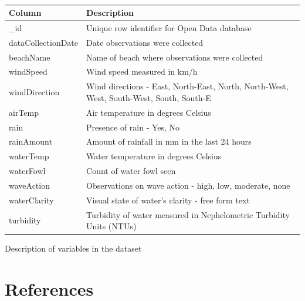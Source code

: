 \documentclass[
  letterpaper,
  DIV=11,
  numbers=noendperiod]{scrartcl}
\begin{document}
\begin{longtable}[t]{ll}

\caption{\label{tbl-sum2}}

\tabularnewline

\toprule
Column & Description\\
\midrule
\_id & Unique row identifier for
Open Data database\\
dataCollectionDate & Date observations were
collected\\
beachName & Name of beach where
observations were
collected\\
windSpeed & Wind speed measured in
km/h\\
windDirection & Wind directions - East,
North-East, North,
North-West, West,
South-West, South,
South-E\\
\addlinespace
airTemp & Air temperature in
degrees Celsius\\
rain & Presence of rain - Yes,
No\\
rainAmount & Amount of rainfall in mm
in the last 24 hours\\
waterTemp & Water temperature in
degrees Celsius\\
waterFowl & Count of water fowl seen\\
\addlinespace
waveAction & Observations on wave
action - high, low,
moderate, none\\
waterClarity & Visual state of water's
clarity - free form text\\
turbidity & Turbidity of water
measured in Nephelometric
Turbidity Units (NTUs)\\
\bottomrule

\end{longtable}

\endgroup{}

Description of variables in the dataset

\newpage

\section*{References}\label{references}
\end{document}

